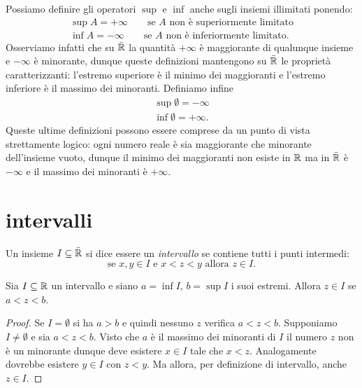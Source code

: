 Possiamo definire gli operatori $\sup$ e $\inf$
anche sugli insiemi illimitati ponendo:
\begin{align*}
  \sup A = +\infty \qquad \text{se $A$ non è superiormente limitato}\\
  \inf A = -\infty \qquad \text{se $A$ non è inferiormente limitato}.
\end{align*}
Osserviamo infatti che su $\bar {\mathbb R}$ la quantità $+\infty$
è maggiorante di qualunque insieme e $-\infty$ è minorante, dunque
queste definizioni mantengono su $\bar {\mathbb R}$ le proprietà caratterizzanti:
l'estremo superiore è il minimo dei maggioranti e
l'estremo inferiore è il massimo dei minoranti.
Definiamo infine
\begin{align*}
  \sup \emptyset = -\infty\\
  \inf \emptyset = +\infty.
\end{align*}
Queste ultime definizioni possono essere comprese da un punto di vista
strettamente logico: ogni numero reale è sia maggiorante che minorante
dell'insieme vuoto, dunque il minimo dei maggioranti non esiste in $\mathbb R$
ma in $\bar {\mathbb R}$ è $-\infty$
e il massimo dei minoranti è $+\infty$.

\section{intervalli}

\begin{definition}[intervallo]
\label{def:intervallo}%
%
Un insieme $I\subseteq \bar{\mathbb R}$ si dice essere un \emph{intervallo}
se contiene tutti i punti intermedi:
\[
  \text{se $x, y \in I$ e $x<z<y$ allora $z \in I$.}
\]
\end{definition}
%
\begin{theorem}
Sia $I\subseteq \mathbb R$ un intervallo e siano $a=\inf I$, $b=\sup I$
i suoi estremi. Allora
$z\in I$ se $a < z < b$.
\end{theorem}
%
\begin{proof}
Se $I=\emptyset$ si ha $a>b$ e quindi nessuno $z$ verifica $a<z<b$.
Supponiamo $I\neq \emptyset$ e
sia $a < z < b$.
Visto che $a$ è il massimo dei minoranti di $I$
il numero $z$ non è un minorante dunque
deve esistere $x \in I$ tale
che $x < z$. Analogamente dovrebbe esistere $y\in I$
con $z<y$.
Ma allora, per definizione di intervallo, anche $z\in I$.
\end{proof}

